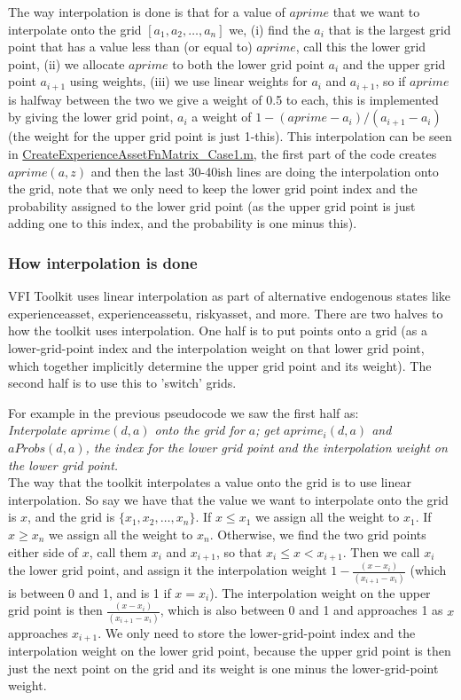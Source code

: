 The way interpolation is done is that for a value of $aprime$ that we want to interpolate onto the grid $[a_1,a_2,\dots,a_n]$ we, (i) find the $a_i$ that is the largest grid point that has a value less than (or equal to) $aprime$, call this the lower grid point, (ii) we allocate $aprime$ to both the lower grid point $a_i$ and the upper grid point $a_{i+1}$ using weights, (iii) we use linear weights for $a_i$ and $a_{i+1}$, so if $aprime$ is halfway between the two we give a weight of 0.5 to each, this is implemented by giving the lower grid point, $a_i$ a weight of $1-(aprime-a_i)/(a_{i+1}-a_i)$ (the weight for the upper grid point is just 1-this). This interpolation can be seen in \href{https://github.com/vfitoolkit/VFIToolkit-matlab/blob/master/aprimeFnMatrix/CreateExperienceAssetFnMatrix_Case1.m}{CreateExperienceAssetFnMatrix\_{}Case1.m}, the first part of the code creates $aprime(a,z)$ and then the last 30-40ish lines are doing the interpolation onto the grid, note that we only need to keep the lower grid point index and the probability assigned to the lower grid point (as the upper grid point is just adding one to this index, and the probability is one minus this).

\subsubsection{How interpolation is done}\label{sec:interp}
VFI Toolkit uses linear interpolation as part of alternative endogenous states like experienceasset, experienceassetu, riskyasset, and more. There are two halves to how the toolkit uses interpolation. One half is to put points onto a grid (as a lower-grid-point index and the interpolation weight on that lower grid point, which together implicitly determine the upper grid point and its weight). The second half is to use this to 'switch' grids.

For example in the previous pseudocode we saw the first half as: \\
\textit{Interpolate $aprime(d,a)$ onto the grid for $a$; get $aprime_i(d,a)$ and $aProbs(d,a)$, the index for the lower grid point and the interpolation weight on the lower grid point.}
\\ The way that the toolkit interpolates a value onto the grid is to use linear interpolation. So say we have that the value we want to interpolate onto the grid is $x$, and the grid is $\{x_1,x_2,\dots,x_n\}$. If $x\leq x_1$ we assign all the weight to $x_1$. If $x\geq x_n$ we assign all the weight to $x_n$. Otherwise, we find the two grid points either side of $x$, call them $x_i$ and $x_{i+1}$, so that $x_i\leq x < x_{i+1}$. Then we call $x_i$ the lower grid point, and assign it the interpolation weight $1-\frac{(x-x_i)}{(x_{i+1}-x_i)}$ (which is between 0 and 1, and is 1 if $x=x_i$). The interpolation weight on the upper grid point is then $\frac{(x-x_i)}{(x_{i+1}-x_i)}$, which is also between 0 and 1 and approaches 1 as $x$ approaches $x_{i+1}$. We only need to store the lower-grid-point index and the interpolation weight on the lower grid point, because the upper grid point is then just the next point on the grid and its weight is one minus the lower-grid-point weight.

